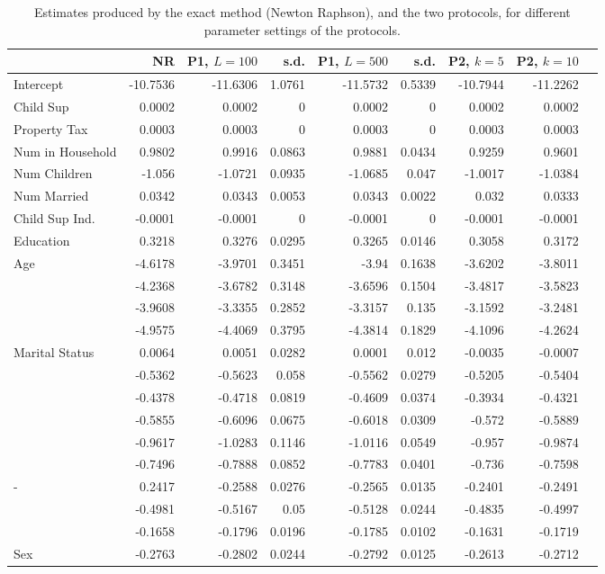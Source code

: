 \documentclass[11pt]{article}
\begin{document}
\begin{table}
\begin{tabular}{|l | r | r r | r  r |  r | r | r|}
\hline

& NR & P1, $L=100$ & s.d. & P1, $L=500$ & s.d. & P2, $k=5$ & P2, $k=10$\\
\hline
Intercept & -10.7536 & -11.6306 & 1.0761 & -11.5732 & 0.5339 & -10.7944 & -11.2262 \\ \hline
Child Sup &0.0002 &  0.0002 & 0 & 0.0002 & 0 & 0.0002 & 0.0002 \\ \hline
Property Tax & 0.0003 &  0.0003 & 0 & 0.0003 & 0 & 0.0003 & 0.0003 \\ \hline
Num in Household & 0.9802  & 0.9916 & 0.0863 & 0.9881 & 0.0434 & 0.9259 & 0.9601 \\\hline
Num Children & -1.056  & -1.0721 & 0.0935 & -1.0685 & 0.047 & -1.0017 & -1.0384 \\\hline
Num Married & 0.0342  & 0.0343 & 0.0053 & 0.0343 & 0.0022 & 0.032 & 0.0333 \\\hline
Child Sup Ind. & -0.0001  & -0.0001 & 0 & -0.0001 & 0 & -0.0001 & -0.0001 \\\hline
Education & 0.3218 & 0.3276 & 0.0295 & 0.3265 & 0.0146 & 0.3058 & 0.3172 \\\hline
\multirow{4}{*}{Age} & -4.6178  & -3.9701 & 0.3451 & -3.94 & 0.1638 & -3.6202 & -3.8011 \\
& -4.2368  & -3.6782 & 0.3148 & -3.6596 & 0.1504 & -3.4817 & -3.5823 \\
& -3.9608 & -3.3355 & 0.2852 & -3.3157 & 0.135 & -3.1592 & -3.2481 \\
& -4.9575 & -4.4069 & 0.3795 & -4.3814 & 0.1829 & -4.1096 & -4.2624 \\ \hline
\multirow{6}{*}{Marital Status} &  0.0064 & 0.0051 & 0.0282 & 0.0001 & 0.012 & -0.0035 & -0.0007 \\
& -0.5362 & -0.5623 & 0.058 & -0.5562 & 0.0279 & -0.5205 & -0.5404 \\
& -0.4378 & -0.4718 & 0.0819 & -0.4609 & 0.0374 & -0.3934 & -0.4321 \\
& -0.5855 & -0.6096 & 0.0675 & -0.6018 & 0.0309 & -0.572 & -0.5889 \\
& -0.9617 & -1.0283 & 0.1146 & -1.0116 & 0.0549 & -0.957 & -0.9874 \\
& -0.7496& -0.7888 & 0.0852 & -0.7783 & 0.0401 & -0.736 & -0.7598 \\ \hline
-\multirow{3}{*}{Race} & 0.2417 & -0.2588 & 0.0276 & -0.2565 & 0.0135 & -0.2401 & -0.2491 \\
& -0.4981 & -0.5167 & 0.05 & -0.5128 & 0.0244 & -0.4835 & -0.4997 \\
& -0.1658 & -0.1796 & 0.0196 & -0.1785 & 0.0102 & -0.1631 & -0.1719 \\ \hline
Sex & -0.2763 & -0.2802 & 0.0244 & -0.2792 & 0.0125 & -0.2613 & -0.2712 \\
\hline
\end{tabular}
\caption{Estimates produced by the exact method (Newton Raphson), and the two protocols, for different parameter settings of the protocols.}
\label{tab:protocol2}
\end{table}
\end{document}
